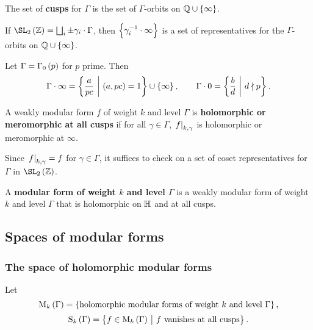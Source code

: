 \begin{definition}
The set of \textbf{cusps} for $ \Gamma $ is the set of $ \Gamma $-orbits on $ \QQ \cup \cbr{\infty} $.
\end{definition}

\begin{note*}
If $ \SL_2\br{\ZZ} = \bigsqcup_i \pm\gamma_i \cdot \Gamma $, then $ \cbr{\gamma_i^{-1} \cdot \infty} $ is a set of representatives for the $ \Gamma $-orbits on $ \QQ \cup \cbr{\infty} $.
\end{note*}

\begin{example*}
Let $ \Gamma = \Gamma_0\br{p} $ for $ p $ prime. Then
$$ \Gamma \cdot \infty = \cbr{\dfrac{a}{pc} \st \br{a, pc} = 1} \cup \cbr{\infty}, \qquad \Gamma \cdot 0 = \cbr{\dfrac{b}{d} \st d \nmid p}. $$
\end{example*}

\begin{definition}
A weakly modular form $ f $ of weight $ k $ and level $ \Gamma $ is \textbf{holomorphic or meromorphic at all cusps} if for all $ \gamma \in \Gamma $, $ \left. f \right|_{k, \gamma} $ is holomorphic or meromorphic at $ \infty $.
\end{definition}

\begin{note*}
Since $ \left. f \right|_{k, \gamma} = f $ for $ \gamma \in \Gamma $, it suffices to check on a set of coset representatives for $ \Gamma $ in $ \SL_2\br{\ZZ} $.
\end{note*}

\begin{definition}
A \textbf{modular form of weight $ k $ and level $ \Gamma $} is a weakly modular form of weight $ k $ and level $ \Gamma $ that is holomorphic on $ \mathbb{H} $ and at all cusps.
\end{definition}

\pagebreak

\subsection{Spaces of modular forms}

\subsubsection{The space of holomorphic modular forms}


Let
$$ \M_k\br{\Gamma} = \cbr{\text{holomorphic modular forms of weight} \ k \ \text{and level} \ \Gamma}, $$
$$ \S_k\br{\Gamma} = \cbr{f \in \M_k\br{\Gamma} \st f \ \text{vanishes at all cusps}}. $$

